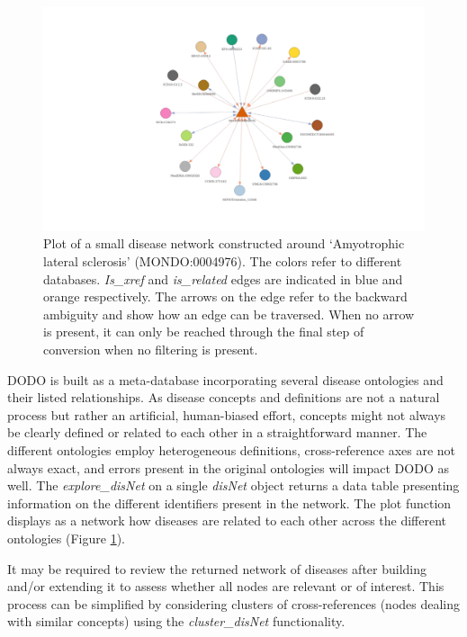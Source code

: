 \documentclass[9pt,a4paper,]{extarticle}
\begin{document}
\begin{figure}

{\centering \includegraphics[width=1\linewidth]{DODO-F1000-publication_files/figure-latex/plotexample-1} 

}

\caption{Plot of a small disease network constructed around `Amyotrophic lateral sclerosis' (MONDO:0004976). The colors refer to different databases. \emph{Is\_xref} and \emph{is\_related} edges are indicated in blue and orange respectively. The arrows on the edge refer to the backward ambiguity and show how an edge can be traversed. When no arrow is present, it can only be reached through the final step of conversion when no filtering is present.}\label{fig:plotexample}
\end{figure}

DODO is built as a meta-database incorporating several disease ontologies and their listed relationships. As disease concepts and definitions are not a natural process but rather an artificial, human-biased effort, concepts might not always be clearly defined or related to each other in a straightforward manner. The different ontologies employ heterogeneous definitions, cross-reference axes are not always exact, and errors present in the original ontologies will impact DODO as well. The \emph{explore\_disNet} on a single \emph{disNet} object returns a data table presenting information on the different identifiers present in the network. The plot function displays as a network how diseases are related to each other across the different ontologies (Figure \ref{fig:plotexample}).

It may be required to review the returned network of diseases after building and/or extending it to assess whether all nodes are relevant or of interest. This process can be simplified by considering clusters of cross-references (nodes dealing with similar concepts) using the \emph{cluster\_disNet} functionality.
\end{document}
